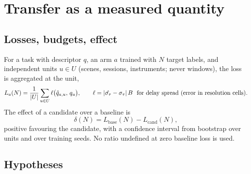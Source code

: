 \section{Transfer as a measured quantity}
\label{sec:transfer}

\subsection[Losses, budgets, effect]{Losses, budgets, effect\hfill{\normalfont\small \tagG{}}}

For a task with descriptor $q$, an arm $a$ trained with $N$ target labels, and independent units $u\in U$ (scenes, sessions, instruments; never windows), the loss is aggregated at the unit,
\begin{equation}
  L_a(N) = \frac{1}{|U|}\sum_{u\in U}\ell\big(\hat q_{a,u},\,q_u\big),
  \qquad
  \ell = |\hat{\sigma_{\tau}}-\sigma_{\tau}|\,B \ \ \text{for delay spread (error in resolution cells)} .
\end{equation}
The effect of a candidate over a baseline is
\begin{equation}
  \delta(N) = L_{\mathrm{base}}(N)-L_{\mathrm{cand}}(N),
  \label{eq:effect}
\end{equation}
positive favouring the candidate, with a confidence interval from bootstrap over units and over training seeds. No ratio undefined at zero baseline loss is used.

\subsection[Hypotheses]{Hypotheses\hfill{\normalfont\small \tagH{}}}

